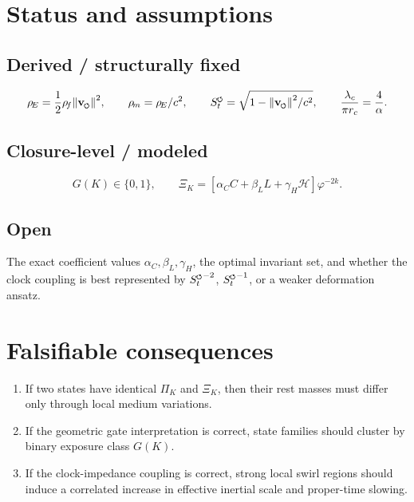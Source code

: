 \documentclass[11pt,a4paper]{article}
\newcommand{\swirlarrow}{\mathchoice{\mkern-2mu\scriptstyle\boldsymbol{\circlearrowleft}}{\mkern-2mu\scriptstyle\boldsymbol{\circlearrowleft}}{\mkern-2mu\scriptscriptstyle\boldsymbol{\circlearrowleft}}{\mkern-2mu\scriptscriptstyle\boldsymbol{\circlearrowleft}}}
\newcommand{\vswirl}{{\mathbf{v}_{\swirlarrow}}}
\newcommand{\SwirlClock}{{S_t^{\swirlarrow}}}
\newcommand{\rhoF}{\rho_{\!f}}
\newcommand{\rhoE}{\rho_{\!E}}
\newcommand{\rhoM}{\rho_{\!m}}
\providecommand{\rc}{r_c}
\begin{document}
        \section{Status and assumptions}
            
            \subsection*{Derived / structurally fixed}
                \begin{equation}
                    \rhoE=\frac12 \rhoF \norm{\vswirl}^2,
                    \qquad
                    \rhoM=\rhoE/c^2,
                    \qquad
                    \SwirlClock=\sqrt{1-\norm{\vswirl}^2/c^2},
                    \qquad
                    \frac{\lambda_c}{\pi \rc}=\frac4\alpha.
                \end{equation}
            
            \subsection*{Closure-level / modeled}
                \begin{equation}
                    G(K)\in\{0,1\},
                    \qquad
                    \Xi_K=
                    \left[\alpha_C C+\beta_L L+\gamma_H \mathcal H\right]\varphi^{-2k}.
                \end{equation}
            
            \subsection*{Open}
                The exact coefficient values \( \alpha_C,\beta_L,\gamma_H \), the optimal invariant set, and whether the clock coupling is best represented by \( \SwirlClock^{-2} \), \( \SwirlClock^{-1} \), or a weaker deformation ansatz.
        
        \section{Falsifiable consequences}
            
            \begin{enumerate}[leftmargin=1.5em]
\item If two states have identical \(\Pi_K\) and \(\Xi_K\), then their rest masses must differ only through local medium variations.
\item If the geometric gate interpretation is correct, state families should cluster by binary exposure class \(G(K)\).
\item If the clock-impedance coupling is correct, strong local swirl regions should induce a correlated increase in effective inertial scale and proper-time slowing.
            \end{enumerate}
            
\end{document}

